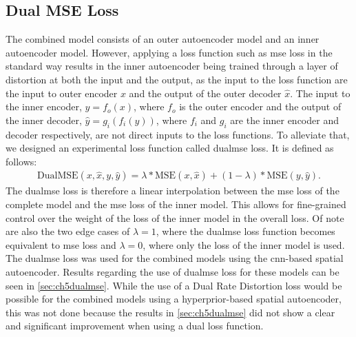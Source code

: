 \subsection{Dual MSE Loss}
The combined model consists of an outer autoencoder model and an inner autoencoder model. However, applying a loss function such as \ac{mse} loss in the standard way results in the inner autoencoder being trained through a layer of distortion at both the input and the output, as the input to the loss function are the input to outer encoder $x$ and the output of the outer decoder $\hat{x}$. The input to the inner encoder, $y=f_o(x)$, where $f_o$ is the outer encoder and the output of the inner decoder, $\hat{y}=g_i(f_i(y))$, where $f_i$ and $g_i$ are the inner encoder and decoder respectively, are not direct inputs to the loss functions. To alleviate that, we designed an experimental loss function called \ac{dualmse} loss. It is defined as follows:
\begin{align}
\text{DualMSE}(x,\hat{x},y,\hat{y}) = \lambda * \text{MSE}(x,\hat{x}) + (1-\lambda) *  \text{MSE}(y,\hat{y}).
\end{align}
The \ac{dualmse} loss is therefore a linear interpolation between the \ac{mse} loss of the complete model and the \ac{mse} loss of the inner model. This allows for fine-grained control over the weight of the loss of the inner model in the overall loss. Of note are also the two edge cases of $\lambda = 1$, where the \ac{dualmse} loss function becomes equivalent to \ac{mse} loss and $\lambda = 0$, where only the loss of the inner model is used. The \ac{dualmse} loss was used for the combined models using the \ac{cnn}-based spatial autoencoder. Results regarding the use of \ac{dualmse} loss for these models can be seen in \autoref{sec:ch5dualmse}. While the use of a Dual Rate Distortion loss would be possible for the combined models using a hyperprior-based spatial autoencoder, this was not done because the results in \autoref{sec:ch5dualmse} did not show a clear and significant improvement when using a dual loss function.

